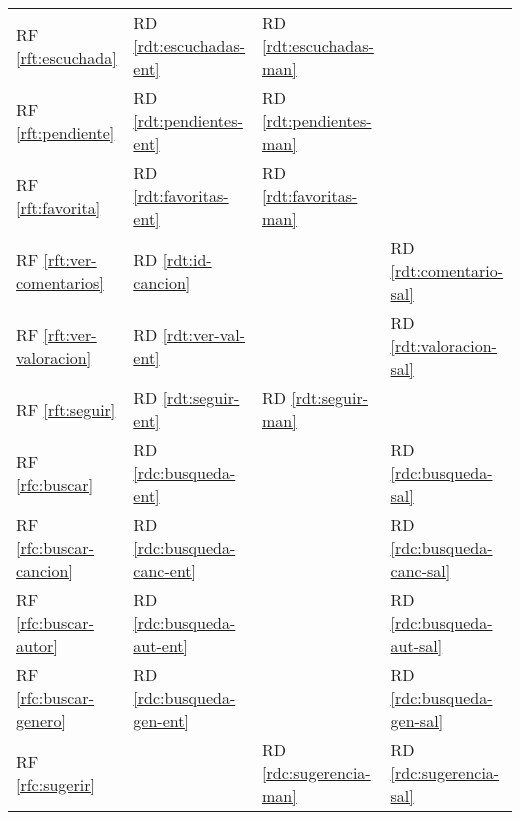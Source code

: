 \documentclass[
  12pt,
  a4paper,
  DIV=12,
  spanish,
]{scrartcl}
\newcounter{RF}
\newcounter{RD}
\begin{document}
\begin{tabularx}{\linewidth}{l|XXX}
  RF \ref{rft:escuchada} & RD \ref{rdt:escuchadas-ent} & RD \ref{rdt:escuchadas-man} & \\
  RF \ref{rft:pendiente} & RD \ref{rdt:pendientes-ent} & RD \ref{rdt:pendientes-man} & \\
  RF \ref{rft:favorita} & RD \ref{rdt:favoritas-ent} & RD \ref{rdt:favoritas-man} & \\
  RF \ref{rft:ver-comentarios} & RD \ref{rdt:id-cancion} & & RD \ref{rdt:comentario-sal}\\
  RF \ref{rft:ver-valoracion} & RD \ref{rdt:ver-val-ent} & & RD \ref{rdt:valoracion-sal} \\
  RF \ref{rft:seguir} & RD \ref{rdt:seguir-ent} & RD \ref{rdt:seguir-man} & \\
  RF \ref{rfc:buscar} & RD \ref{rdc:busqueda-ent} & & RD \ref{rdc:busqueda-sal} \\
  RF \ref{rfc:buscar-cancion} & RD \ref{rdc:busqueda-canc-ent} & & RD \ref{rdc:busqueda-canc-sal} \\
  RF \ref{rfc:buscar-autor} & RD \ref{rdc:busqueda-aut-ent} & & RD \ref{rdc:busqueda-aut-sal} \\
  RF \ref{rfc:buscar-genero} & RD \ref{rdc:busqueda-gen-ent} & & RD \ref{rdc:busqueda-gen-sal} \\
  RF \ref{rfc:sugerir} & & RD \ref{rdc:sugerencia-man} & RD \ref{rdc:sugerencia-sal}\\
\end{tabularx}
\end{document}
